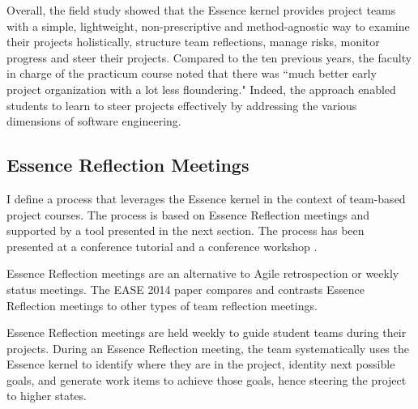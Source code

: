 \documentclass[preprint,12pt,3p]{elsarticle}
\begin{document}
Overall, the field study showed that the Essence kernel provides project teams with a simple, lightweight, non-prescriptive and method-agnostic way to examine their projects holistically, structure team reflections, manage risks, monitor progress and steer their projects. Compared to the ten previous years, the faculty in charge of the practicum course noted that there was ``much better early project organization with a lot less floundering." Indeed, the approach enabled students to learn to steer projects effectively by addressing the various dimensions of software engineering.


\subsection{Essence Reflection Meetings}
\label{EssenceReflectionMeetings}
I define a process that leverages the Essence kernel in the context of team-based project courses. The process is based on Essence Reflection meetings and supported by a tool presented in the next section. The process has been presented at a conference tutorial \cite{SCSE2015Tutorial} and a conference workshop \cite{CSEET2015Workshop}. 

Essence Reflection meetings are an alternative to Agile retrospection or weekly status meetings. The EASE 2014 paper \cite{EASE2014} compares and contrasts Essence Reflection meetings to other types of team reflection meetings.

Essence Reflection meetings are held weekly to guide student teams during their projects. During an Essence Reflection meeting, the team systematically uses the Essence kernel to identify where they are in the project, identity next possible goals, and generate work items to achieve those goals, hence steering the project to higher states. 
\end{document}

